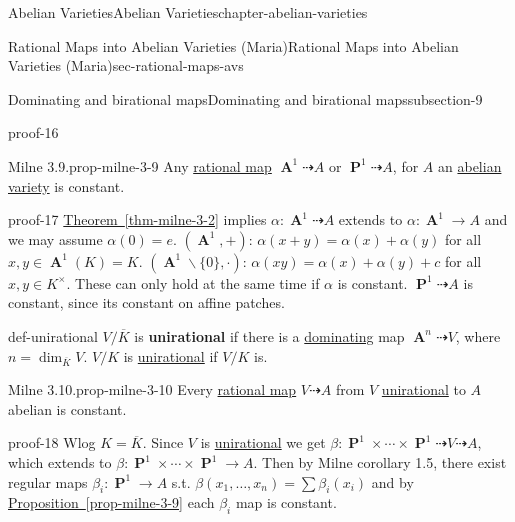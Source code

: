 \documentclass[oneside,10pt,]{book}
\newcommand{\terminology}[1]{\textbf{#1}}
\numberwithin{equation}{section}
\DeclareMathOperator{\aff}{\mathbf{A}}
\DeclareMathOperator{\PP}{\mathbf{P}}
\begin{document}
\begin{chapterptx}{Abelian Varieties}{}{Abelian Varieties}{}{}{chapter-abelian-varieties}
\begin{sectionptx}{Rational Maps into Abelian Varieties (Maria)}{}{Rational Maps into Abelian Varieties (Maria)}{}{}{sec-rational-maps-avs}
\begin{subsectionptx}{Dominating and birational maps}{}{Dominating and birational maps}{}{}{subsection-9}
\begin{proofptx}{}{proof-16}
\end{proofptx}
\begin{proposition}{Milne 3.9.}{}{prop-milne-3-9}%
\hypertarget{p-102}{}%
Any \hyperref[def-rational-map]{rational map} \(\aff^1 \dashrightarrow A\) or \(\PP^1 \dashrightarrow A\), for \(A\) an \hyperref[def-buntes-abvar]{abelian variety} is constant.%
\end{proposition}
\begin{proofptx}{}{proof-17}
\hypertarget{p-103}{}%
\hyperref[thm-milne-3-2]{Theorem~\ref{thm-milne-3-2}} implies \(\alpha \colon \aff^1 \dashrightarrow A\) extends to \(\alpha \colon \aff^1\to A\) and we may assume \(\alpha(0) = e\). \((\aff^1, +)\): \(\alpha(x+y) = \alpha(x) + \alpha(y)\) for all \(x,y\in \aff^1(K) = K\). \((\aff^1\smallsetminus\{0\}, \cdot)\): \(\alpha(xy) = \alpha(x) + \alpha(y) + c\) for all \(x,y\in K^\times\). These can only hold at the same time if \(\alpha\) is constant. \(\PP^1 \dashrightarrow A\) is constant, since its constant on affine patches.%
\end{proofptx}
\begin{definition}{}{def-unirational}%
\hypertarget{p-104}{}%
\(V/\overline K\) is \terminology{unirational} if there is a \hyperref[def-dominating-maps]{dominating} map \(\aff^n \dashrightarrow V\), where \(n = \dim_{\overline K} V\). \(V/K\) is \hyperref[def-unirational]{unirational} if \(V/K\) is.%
\end{definition}
\begin{proposition}{Milne 3.10.}{}{prop-milne-3-10}%
\hypertarget{p-105}{}%
Every \hyperref[def-rational-map]{rational map} \(V\dashrightarrow A\) from \(V\) \hyperref[def-unirational]{unirational} to \(A\) abelian is constant.%
\end{proposition}
\begin{proofptx}{}{proof-18}
\hypertarget{p-106}{}%
Wlog \(K = \overline K\). Since \(V\) is \hyperref[def-unirational]{unirational} we get \(\beta \colon \PP^1\times\cdots\times\PP^1 \dashrightarrow V\dashrightarrow A\), which extends to \(\beta \colon \PP^1\times\cdots\times\PP^1 \to A\). Then by Milne corollary 1.5, there exist regular maps \(\beta_i \colon \PP^1 \to A\) s.t. \(\beta(x_1,\ldots, x_n) = \sum \beta_i(x_i)\) and by \hyperref[prop-milne-3-9]{Proposition~\ref{prop-milne-3-9}} each \(\beta_i\) map is constant.%
\end{proofptx}
\end{subsectionptx}
\end{sectionptx}
%
%
\typeout{************************************************}

\end{chapterptx}
\end{document}
